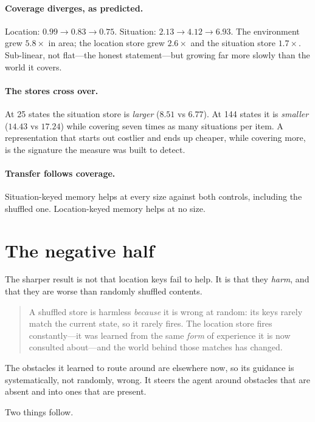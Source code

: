\documentclass[11pt]{article}
\begin{document}
\paragraph{Coverage diverges, as predicted.} Location: $0.99 \to 0.83 \to
0.75$. Situation: $2.13 \to 4.12 \to 6.93$. The environment grew $5.8\times$ in
area; the location store grew $2.6\times$ and the situation store $1.7\times$.
Sub-linear, not flat---the honest statement---but growing far more slowly than
the world it covers.

\paragraph{The stores cross over.} At 25 states the situation store is
\emph{larger} ($8.51$ vs $6.77$). At 144 states it is \emph{smaller} ($14.43$
vs $17.24$) while covering seven times as many situations per item. A
representation that starts out costlier and ends up cheaper, while covering
more, is the signature the measure was built to detect.

\paragraph{Transfer follows coverage.} Situation-keyed memory helps at every
size against both controls, including the shuffled one. Location-keyed memory
helps at no size.

\section{The negative half}

The sharper result is not that location keys fail to help. It is that they
\emph{harm}, and that they are worse than randomly shuffled contents.

\begin{quote}
A shuffled store is harmless \emph{because} it is wrong at random: its keys
rarely match the current state, so it rarely fires. The location store fires
constantly---it was learned from the same \emph{form} of experience it is now
consulted about---and the world behind those matches has changed.
\end{quote}

The obstacles it learned to route around are elsewhere now, so its guidance is
systematically, not randomly, wrong. It steers the agent around obstacles that
are absent and into ones that are present.

Two things follow.
\end{document}
